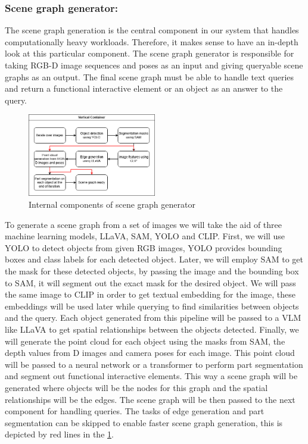 \subsubsection{Scene graph generator:}
The scene graph generation is the central component in our system that handles computationally heavy workloads. Therefore, it makes sense to have an 
in-depth look at this particular component. The scene graph generator is responsible for taking RGB-D image sequences and poses as an input and giving queryable scene graphs
as an output. The final scene graph must be able to handle text queries and return a functional interactive element or an object as an answer to the query. \\
\begin{figure}[ht!]
    \centering
    \includegraphics[width=0.5\textwidth]{content/images/SceneGraphGenerator.png}
    \caption{Internal components of scene graph generator}
    \label{fig:sceneGrahpGenerator}
\end{figure}
To generate a scene graph from a set of images we will take the aid of three machine learning models, LLaVA, SAM, YOLO and CLIP. First, we will use YOLO to detect 
objects from given RGB images, YOLO provides bounding boxes and class labels for each detected object. Later, we will employ SAM to get the mask for these detected 
objects, by passing the image and the bounding box to SAM, it will segment out the exact mask for the desired object. We will pass the same image to CLIP
in order to get textual embedding for the image, these embeddings will be used later while querying to find similarities between objects and the query. 
Each object generated from this pipeline will be passed to a VLM like LLaVA to get spatial relationships between the objects detected. Finally,
we will generate the point cloud for each object using the masks from SAM, the depth values from D images and camera poses for each image. This point cloud
will be passed to a neural network or a transformer to perform part segmentation and segment out functional interactive elements. This way a scene graph will be generated where objects will be
the nodes for this graph and the spatial relationships will be the edges. The scene graph will be then passed to the next component for handling queries.
The tasks of edge generation and part segmentation can be skipped to enable faster scene graph generation, 
this is depicted by red lines in the \cref{fig:sceneGrahpGenerator}.
